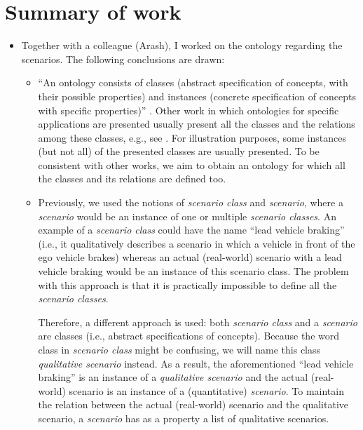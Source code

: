 \documentclass[10pt,final,a4paper,oneside,onecolumn]{article}
\begin{document}
\section{Summary of work}

\begin{itemize}
	\item Together with a colleague (Arash), I worked on the ontology regarding the scenarios. The following conclusions are drawn:
	\begin{itemize}
		\item ``An ontology consists of classes (abstract specification of concepts, with their possible properties) and instances (concrete specification of concepts with specific properties)'' \cite{vanDamPhDThesis2009}. Other work in which ontologies for specific applications are presented usually present all the classes and the relations among these classes, e.g., see \cite{jones2011international, gkoutos2004mouse, kim2005security, chen2003ontology, golemati2007creating, lee2017location, matsokis2010plm, vanDamPhDThesis2009}. For illustration purposes, some instances (but not all) of the presented classes are usually presented. To be consistent with other works, we aim to obtain an ontology for which all the classes and its relations are defined too.
		
		\item Previously, we used the notions of \emph{scenario class} and \emph{scenario}, where a \emph{scenario} would be an instance of one or multiple \emph{scenario classes}. An example of a \emph{scenario class} could have the name ``lead vehicle braking'' (i.e., it qualitatively describes a scenario in which a vehicle in front of the ego vehicle brakes) whereas an actual (real-world) scenario with a lead vehicle braking would be an instance of this scenario class. The problem with this approach is that it is practically impossible to define all the \emph{scenario classes}.
		
		Therefore, a different approach is used: both \emph{scenario class} and a \emph{scenario} are classes (i.e., abstract specifications of concepts). Because the word class in \emph{scenario class} might be confusing, we will name this class \emph{qualitative scenario} instead. As a result, the aforementioned ``lead vehicle braking'' is an instance of a \emph{qualitative scenario} and the actual (real-world) scenario is an instance of a (quantitative) \emph{scenario}. To maintain the relation between the actual (real-world) scenario and the qualitative scenario, a \emph{scenario} has as a property a list of qualitative scenarios.
		

\end{itemize}
\end{itemize}
\end{document}
